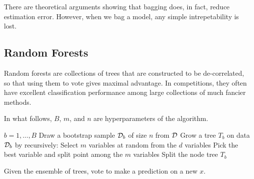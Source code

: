 There are theoretical arguments showing that bagging does, in fact,
reduce estimation error.  However, when we bag a model, any simple
intrepetability is lost.



\subsection{Random Forests}

Random forests are collections of trees that are constructed to be
de-correlated, so that using them to vote gives maximal advantage.
In competitions, they often have excellent classification performance
among large collections of much fancier methods.

In what follows, $B$, $m$, and $n$ are hyperparameters of the algorithm.

\begin{codebox}
  \li  \For $b = 1, \ldots, B$
  \Do
  \li    Draw a bootstrap sample ${\cal D}_b$ of size $n$ from ${\cal D}$
  \li    Grow a tree $T_b$ on data ${\cal D}_b$ by recursively:
  \Do
  \li      Select $m$ variables at random from the $d$ variables
  \li      Pick the best variable and split point among the $m$ variables
  \li      Split the node
  \End
  \End
  \li   \Return tree $T_b$
\end{codebox}
Given the ensemble of trees, vote to make a prediction on a new $x$.

